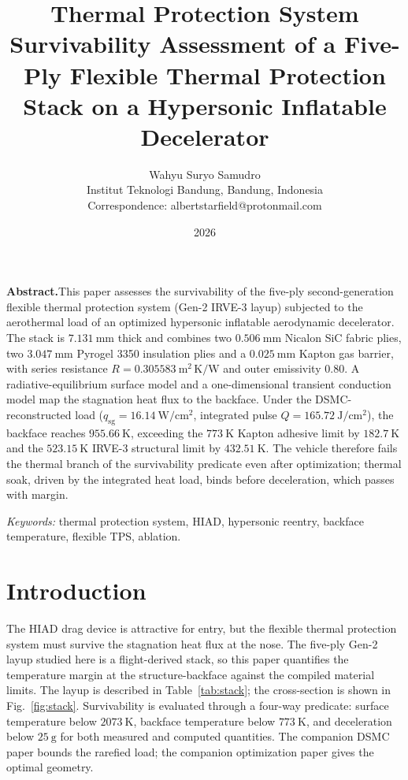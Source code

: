 \documentclass[10pt]{article}
\begin{document}
\title{Thermal Protection System Survivability Assessment of a Five-Ply Flexible Thermal Protection Stack on a Hypersonic Inflatable Decelerator}
\author{Wahyu Suryo Samudro\\
Institut Teknologi Bandung, Bandung, Indonesia\\
Correspondence: albertstarfield@protonmail.com}
\date{2026}
\maketitle

\noindent\textbf{Abstract.}\quad This paper assesses the survivability of the five-ply second-generation flexible thermal protection system (Gen-2 IRVE-3 layup) subjected to the aerothermal load of an optimized hypersonic inflatable aerodynamic decelerator. The stack is $7.131~\mathrm{mm}$ thick and combines two $0.506~\mathrm{mm}$ Nicalon SiC fabric plies, two $3.047~\mathrm{mm}$ Pyrogel 3350 insulation plies and a $0.025~\mathrm{mm}$ Kapton gas barrier, with series resistance $R=0.305583~\mathrm{m^2\,K/W}$ and outer emissivity $0.80$. A radiative-equilibrium surface model and a one-dimensional transient conduction model map the stagnation heat flux to the backface. Under the DSMC-reconstructed load ($q_{\mathrm{sg}}=16.14~\mathrm{W/cm^2}$, integrated pulse $Q=165.72~\mathrm{J/cm^2}$), the backface reaches $955.66~\mathrm{K}$, exceeding the $773~\mathrm{K}$ Kapton adhesive limit by $182.7~\mathrm{K}$ and the $523.15~\mathrm{K}$ IRVE-3 structural limit by $432.51~\mathrm{K}$. The vehicle therefore fails the thermal branch of the survivability predicate even after optimization; thermal soak, driven by the integrated heat load, binds before deceleration, which passes with margin.
\par\vspace{0.5em}

\noindent\textit{Keywords:} thermal protection system, HIAD, hypersonic reentry, backface temperature, flexible TPS, ablation.\par\vspace{0.8em}

\section{Introduction}
The HIAD drag device is attractive for entry, but the flexible thermal protection system must survive the stagnation heat flux at the nose. The five-ply Gen-2 layup studied here is a flight-derived stack, so this paper quantifies the temperature margin at the structure-backface against the compiled material limits. The layup is described in Table~\ref{tab:stack}; the cross-section is shown in Fig.~\ref{fig:stack}. Survivability is evaluated through a four-way predicate: surface temperature below $2073~\mathrm{K}$, backface temperature below $773~\mathrm{K}$, and deceleration below $25~\mathrm{g}$ for both measured and computed quantities. The companion DSMC paper bounds the rarefied load; the companion optimization paper gives the optimal geometry.
\end{document}
